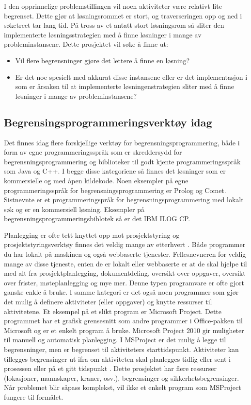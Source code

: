 I den opprinnelige problemstillingen vil noen aktiviteter være relativt lite begrenset. Dette gjør at løsningsrommet er stort, og traverseringen opp og ned i søketreet tar lang tid. På tross av et antatt stort løsningsrom så sliter den \ilog implementerte løsningsstrategien med å finne løsninger i mange av probleminstansene. Dette prosjektet vil søke å finne ut:

\begin{itemize}
\item Vil flere begrensninger gjøre det lettere å finne en løsning?
\item Er det noe spesielt med akkurat disse instansene eller er det implementasjon i \ilog som er årsaken til at \ilog implementerte løsningenstrategien sliter med å finne løsninger i mange av probleminstansene?
\end{itemize}

\subsection{Begrensingsprogrammeringsverktøy idag}
Det finnes idag flere forskjellige verktøy for begrensningsprogrammering, både i form av egne programmeringsspråk som er skreddersydd for begrensningsprogrammering og biblioteker til godt kjente programmeringsspråk som Java og C++. I begge disse kategoriene så finnes det løsninger som er kommersielle og med åpen kildekode. Noen eksempler på egne programmeringsspråk for begrensningsprogrammering er Prolog og Comet. Sistnevnte er et programmeringspråk for begrensningsprogrammering med lokalt søk og er en kommersiell løsning. Eksempler på begrensningsprogrammeringsbiblotek så er det IBM ILOG CP.

Planlegging er ofte tett knyttet opp mot prosjektstyring og prosjektstyringsverktøy finnes det veldig mange av etterhvert \cite{projectmanagmenttoolswiki}. Både programmer du har lokalt på maskinen og også webbaserte tjenester. Fellesnevneren for veldig mange av disse tjeneste, enten de er lokalt eller webbaserte er at de skal hjelpe til med alt fra prosjektplanlegging, dokumentdeling, oversikt over oppgaver, oversikt over frister, møteplanlegging og mye mer. Denne typen programvare er ofte gjort ganske enkle å bruke. I samme kategori er det også noen programmer som gjør det mulig å definere aktiviteter (eller oppgaver) og knytte ressurser til aktivitetene. Et eksempel på et slikt program er Microsoft Project. Dette programmet har et grafisk grensesnitt som andre programmer i Office-pakken til Microsoft og er et enkelt program å bruke. Microsoft Project 2010 gir muligheter til manuell og automatisk planlegging\cite{msproject2010blog}. I MSProject er det mulig å legge til begrensninger, men er begrenset til aktiviteters starttidspunkt. Aktiviteter kan tillegges begrensinger ut ifra om aktiviteten skal planlegges tidlig eller sent i prosessen eller på et gitt tidspunkt \cite{begrensingermsproject}. Dette prosjektet har flere ressurser (lokasjoner, mannskaper, kraner, osv.), begrensinger og sikkerhetsbegrensinger. Når problemet blir såpass komplekst, vil ikke et enkelt program som MSProject fungere til formålet.

